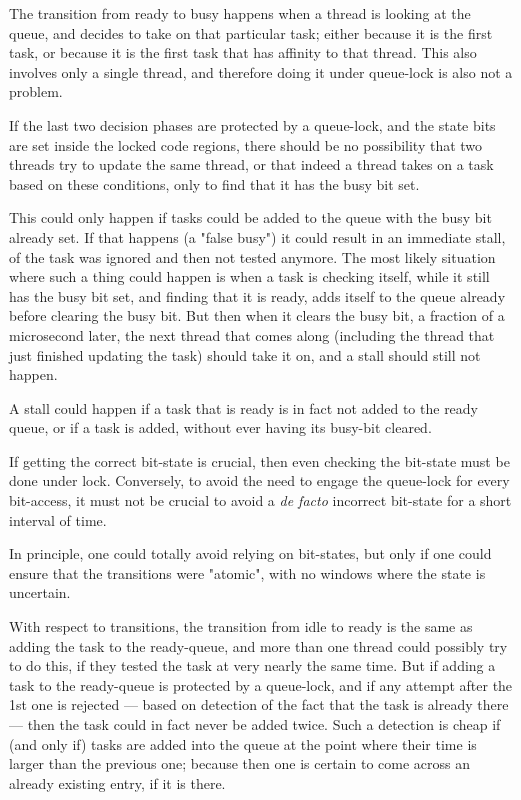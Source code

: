 \documentclass[paper=a4,fontsize=11pt]{scrartcl}
\numberwithin{equation}{section}		%
\numberwithin{figure}{section}			%
\numberwithin{table}{section}				%
\begin{document}
The transition from ready to busy happens when a thread is looking at the queue, and decides to take on that particular task; either because it is the first task, or because it is the first task that has affinity to that thread.  This also involves only a single thread, and therefore doing it under queue-lock is also not a problem.

If the last two decision phases are protected by a queue-lock, and the state bits are set inside the locked code regions, there should be no possibility that two threads try to update the same thread, or that indeed a thread takes on a task based on these conditions, only to find that it has the busy bit set.

This could only happen if tasks could be added to the queue with the busy bit already set.  If that happens (a "false busy") it could result in an immediate stall, of the task was ignored and then not tested anymore.  The most likely situation where such a thing could happen is when a task is checking itself, while it still has the busy bit set, and finding that it is ready, adds itself to the queue already before clearing the busy bit.  But then when it clears the busy bit, a fraction of a microsecond later, the next thread that comes along (including the thread that just finished updating the task) should take it on, and a stall should still not happen.

A stall could happen if a task that is ready is in fact not added to the ready queue, or if a task is added, without ever having its busy-bit cleared.

If getting the correct bit-state is crucial, then even checking the bit-state must be done under lock.  Conversely, to avoid the need to engage the queue-lock for every bit-access, it must not be crucial to avoid a \textit{de facto} incorrect bit-state for a short interval of time.

In principle, one could totally avoid relying on bit-states, but only if one could ensure that the transitions were "atomic", with no windows where the state is uncertain.

With respect to transitions, the transition from idle to ready is the same as adding the task to the ready-queue, and more than one thread could possibly try to do this, if they tested the task at very nearly the same time.  But if adding a task to the ready-queue is protected by a queue-lock, and if any attempt after the 1st one is rejected --- based on detection of the fact that the task is already there --- then the task could in fact never be added twice.  Such a detection is cheap if (and only if) tasks are added into the queue at the point where their time is larger than the previous one; because then one is certain to come across an already existing entry, if it is there.
\end{document}
